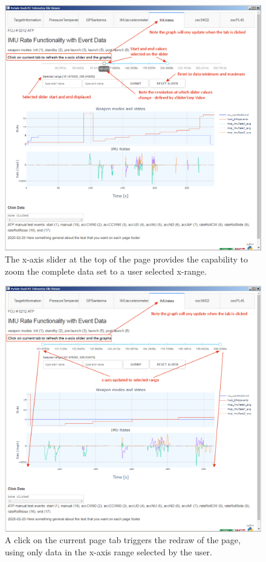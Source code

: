 \begin{figure}[h]
\centering
\includegraphics[width=\textwidth]{pic/dashview-subPlot2Slider1}
\caption{The x-axis slider at the top of the page provides the capability to zoom the complete data set to a user selected x-range.
\label{fig:dashview-subPlot2Slider1}}
\end{figure}

\begin{figure}[h]
\centering
\includegraphics[width=\textwidth]{pic/dashview-subPlot2Slider2}
\caption{A click on the current page tab triggers the redraw of the page, using only data in the x-axis range selected by the user.
\label{fig:dashview-subPlot2Slider2}}
\end{figure}

